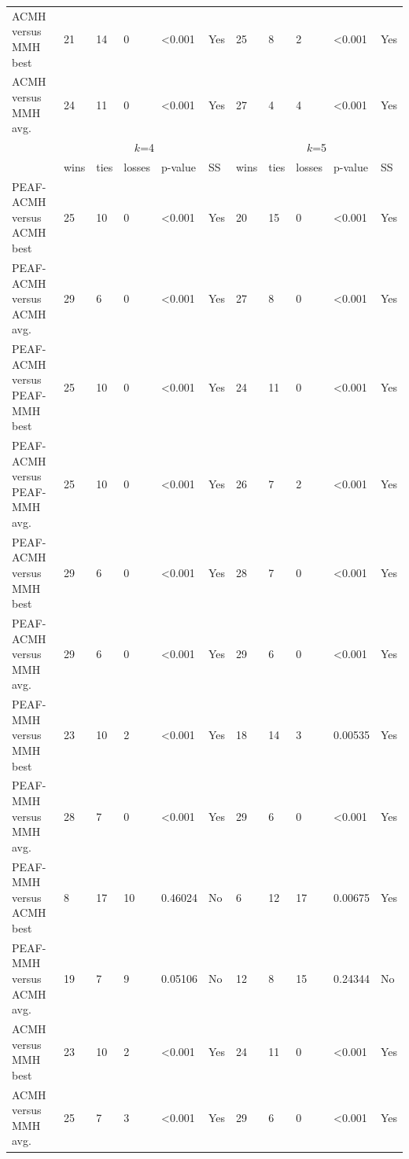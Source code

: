 \documentclass[12pt, a4paper]{article}%
\numberwithin{equation}{section}
\theoremstyle{plain}
\begin{document}
{\begin{landscape}
\begin{longtable}{|l|lllll|lllll|}
							ACMH versus MMH best                   & 21   & 14   & 0      & \textless{}0.001 & Yes & 25   & 8    & 2      & \textless{}0.001 & Yes \\
							ACMH versus MMH avg.                   & 24   & 11   & 0      & \textless{}0.001 & Yes & 27   & 4    & 4      & \textless{}0.001 & Yes \\ \hline
							\multicolumn{1}{|c|}{\multirow{2}{*}{}} & \multicolumn{5}{c|}{$k$=4}                    & \multicolumn{5}{c|}{$k$=5}                    \\ \cline{2-11} 
							\multicolumn{1}{|c|}{}                  & wins & ties & losses & p-value          & SS  & wins & ties & losses & p-value          & SS  \\ \hline
							PEAF-ACMH versus ACMH best             & 25   & 10   & 0      & \textless{}0.001 & Yes & 20   & 15   & 0      & \textless{}0.001 & Yes \\
							PEAF-ACMH versus ACMH avg.             & 29   & 6    & 0      & \textless{}0.001 & Yes & 27   & 8    & 0      & \textless{}0.001 & Yes \\
							PEAF-ACMH versus PEAF-MMH best           & 25   & 10   & 0      & \textless{}0.001 & Yes & 24   & 11   & 0      & \textless{}0.001 & Yes \\
							PEAF-ACMH versus PEAF-MMH avg.           & 25   & 10   & 0      & \textless{}0.001 & Yes & 26   & 7    & 2      & \textless{}0.001 & Yes \\
							PEAF-ACMH versus MMH best               & 29   & 6    & 0      & \textless{}0.001 & Yes & 28   & 7    & 0      & \textless{}0.001 & Yes \\
							PEAF-ACMH versus MMH avg.               & 29   & 6    & 0      & \textless{}0.001 & Yes & 29   & 6    & 0      & \textless{}0.001 & Yes \\
							PEAF-MMH versus MMH best                 & 23   & 10   & 2      & \textless{}0.001 & Yes & 18   & 14   & 3      & 0.00535          & Yes \\
							PEAF-MMH versus MMH avg.                 & 28   & 7    & 0      & \textless{}0.001 & Yes & 29   & 6    & 0      & \textless{}0.001 & Yes \\
							PEAF-MMH versus ACMH best               & 8    & 17   & 10     & 0.46024          & No  & 6    & 12   & 17     & 0.00675          & Yes \\
							PEAF-MMH versus ACMH avg.               & 19   & 7    & 9      & 0.05106          & No  & 12   & 8    & 15     & 0.24344          & No  \\
							ACMH versus MMH best                   & 23   & 10   & 2      & \textless{}0.001 & Yes & 24   & 11   & 0      & \textless{}0.001 & Yes \\
							ACMH versus MMH avg.                   & 25   & 7    & 3      & \textless{}0.001 & Yes & 29   & 6    & 0      & \textless{}0.001 & Yes \\ \hline
						\end{longtable}
					\end{landscape}
				}
				
\end{document}
